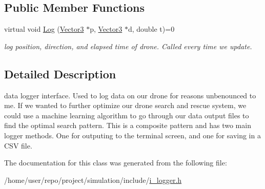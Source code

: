 \subsection*{Public Member Functions}
\begin{DoxyCompactItemize}
\item 
\mbox{\label{classiLogger_a1809fbe5bc65d1c18de646e5173aa304}} 
virtual void \hyperlink{classiLogger_a1809fbe5bc65d1c18de646e5173aa304}{Log} (\hyperlink{classVector3}{Vector3} $\ast$p, \hyperlink{classVector3}{Vector3} $\ast$d, double t)=0
\begin{DoxyCompactList}\small\item\em log position, direction, and elapsed time of drone. Called every time we update. \end{DoxyCompactList}\end{DoxyCompactItemize}


\subsection{Detailed Description}
data logger interface. Used to log data on our drone for reasons unbenounced to me. If we wanted to further optimize our drone search and rescue system, we could use a machine learning algorithm to go through our data output files to find the optimal search pattern. This is a composite pattern and has two main logger methods. One for outputing to the terminal screen, and one for saving in a C\+SV file. 

The documentation for this class was generated from the following file\+:\begin{DoxyCompactItemize}
\item 
/home/user/repo/project/simulation/include/\hyperlink{i__logger_8h}{i\+\_\+logger.\+h}\end{DoxyCompactItemize}
